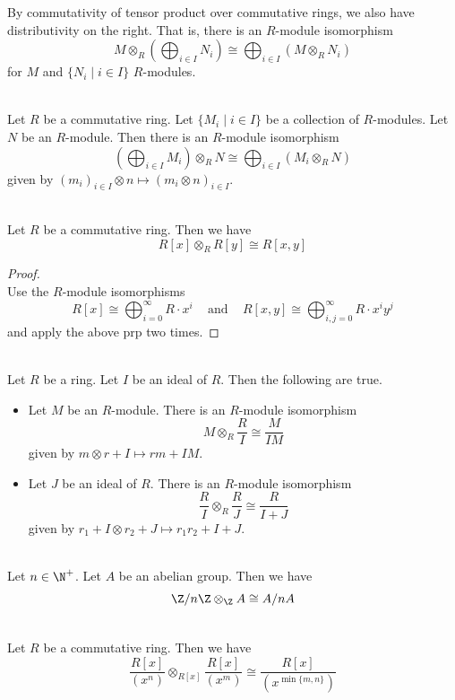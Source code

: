 \documentclass[a4paper]{article}
\begin{document}
By commutativity of tensor product over commutative rings, we also have distributivity on the right. That is, there is an $R$-module isomorphism $$M\otimes_R\left(\bigoplus_{i\in I}N_i\right)\cong\bigoplus_{i\in I}(M\otimes_RN_i)$$ for $M$ and $\{N_i\;|\;i\in I\}$ $R$-modules. 

\begin{prp}{}{}\\
Let $R$ be a commutative ring. Let $\{M_i\;|\;i\in I\}$ be a collection of $R$-modules. Let $N$ be an $R$-module. Then there is an $R$-module isomorphism $$\left(\bigoplus_{i\in I}M_i\right)\otimes_RN\cong\bigoplus_{i\in I}(M_i\otimes_RN)$$ given by $(m_i)_{i\in I}\otimes n\mapsto(m_i\otimes n)_{i\in I}$. 
\end{prp}

\begin{eg}{}{}\\
Let $R$ be a commutative ring. Then we have $$R[x]\otimes_RR[y]\cong R[x,y]$$
\begin{proof}\\
Use the $R$-module isomorphisms $$R[x]\cong\bigoplus_{i=0}^\infty R\cdot x^i\;\;\;\text{ and }\;\;\;R[x,y]\cong\bigoplus_{i,j=0}^\infty R\cdot x^iy^j$$ and apply the above prp two times. 
\end{proof}
\end{eg}

\begin{prp}{}{}\\
Let $R$ be a ring. Let $I$ be an ideal of $R$. Then the following are true. 
\begin{itemize}
\item Let $M$ be an $R$-module. There is an $R$-module isomorphism $$M\otimes_R\frac{R}{I}\cong\frac{M}{IM}$$ given by $m\otimes r+I\mapsto rm+IM$. 
\item Let $J$ be an ideal of $R$. There is an $R$-module isomorphism $$\frac{R}{I}\otimes_R\frac{R}{J}\cong\frac{R}{I+J}$$ given by $r_1+I\otimes r_2+J\mapsto r_1r_2+I+J$. 
\end{itemize}
\end{prp}

\begin{eg}{}{}\\
Let $n\in\N^+$. Let $A$ be an abelian group. Then we have $$\Z/n\Z\otimes_\Z A\cong A/nA$$
\end{eg}

\begin{eg}{}{}\\
Let $R$ be a commutative ring. Then we have $$\frac{R[x]}{(x^n)}\otimes_{R[x]}\frac{R[x]}{(x^m)}\cong\frac{R[x]}{(x^{\min\{m,n\}})}$$
\end{eg}
\end{document}
